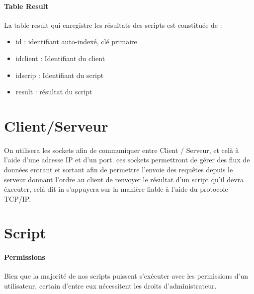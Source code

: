 \documentclass[11pt,a4paper,titlepage, oneside]{article}
\begin{document}
		\paragraph{Table Result}
			La table result qui enregistre les résultats des scripts est constituée de :
			\begin{itemize}
				\item id : identifiant auto-indexé, clé primaire
				\item idclient : Identifiant du client
				\item idscrip : Identifiant du script
				\item result : résultat du script
			\end{itemize}
		
		
\newpage
\section{{\color{red} Client/Serveur}}
\paragraph{}
On utilisera les sockets afin de communiquer entre Client / Serveur, et celà à l'aide d'une adresse IP et d'un port. ces sockets permettront de gérer des flux de données entrant et sortant afin de permettre l'envoie des requêtes depuis le serveur donnant l'ordre au client de renvoyer le résultat d'un script qu'il devra éxecuter, celà dit in s'appuyera sur la manière fiable à l'aide du protocole TCP/IP. 


\newpage
\section{{\color{red} Script }}
	\paragraph{Permissions}
		Bien que la majorité de nos scripts puissent s'exécuter avec les permissions d'un utilisateur, certain d'entre eux nécessitent les droits d'administrateur.\\
\end{document}
